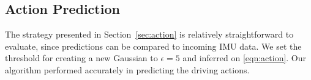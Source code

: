 \subsection{Action Prediction}
The strategy presented in Section~\ref{sec:action} is relatively straightforward
to evaluate, since predictions can be compared to incoming IMU data. We set the
threshold for creating a new Gaussian to $\epsilon=5$ and inferred on
\eqref{eqn:action}. Our algorithm performed accurately in predicting the driving
actions.
